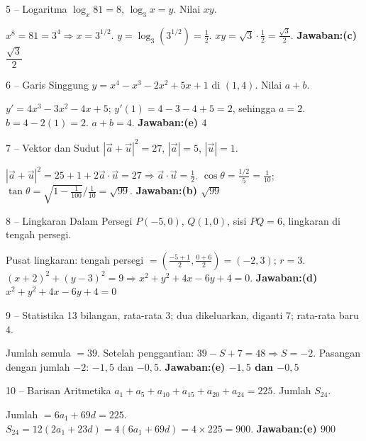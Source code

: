 \documentclass[11pt]{article}
\newcommand{\jawaban}[1]{\textbf{Jawaban:}\enspace\colorbox{gold!30}{\textbf{#1}}}
\begin{document}
\begin{soal}{5 -- Logaritma}
$\log_x81=8$, $\log_3x=y$. Nilai $xy$.
\end{soal}
\begin{pembox}
$x^8=81=3^4\Rightarrow x=3^{1/2}$. $y=\log_3(3^{1/2})=\frac12$. $xy=\sqrt3\cdot\frac12=\frac{\sqrt3}{2}$.
\jawaban{(c) $\dfrac{\sqrt3}{2}$}
\end{pembox}

\begin{soal}{6 -- Garis Singgung}
$y=x^4-x^3-2x^2+5x+1$ di $(1,4)$. Nilai $a+b$.
\end{soal}
\begin{pembox}
$y'=4x^3-3x^2-4x+5$; $y'(1)=4-3-4+5=2$, sehingga $a=2$.
$b=4-2(1)=2$. $a+b=4$.
\jawaban{(e) $4$}
\end{pembox}

\begin{soal}{7 -- Vektor dan Sudut}
$|\vec a+\vec u|^2=27$, $|\vec a|=5$, $|\vec u|=1$.
\end{soal}
\begin{pembox}
$|\vec a+\vec u|^2=25+1+2\vec a\cdot\vec u=27\Rightarrow\vec a\cdot\vec u=\frac12$.
$\cos\theta=\frac{1/2}{5}=\frac{1}{10}$; $\tan\theta=\sqrt{1-\frac{1}{100}}\big/\frac{1}{10}=\sqrt{99}$.
\jawaban{(b) $\sqrt{99}$}
\end{pembox}

\begin{soal}{8 -- Lingkaran Dalam Persegi}
$P(-5,0)$, $Q(1,0)$, sisi $PQ=6$, lingkaran di tengah persegi.
\end{soal}
\begin{pembox}
Pusat lingkaran: tengah persegi $=\left(\frac{-5+1}{2},\frac{0+6}{2}\right)=(-2,3)$; $r=3$.
$(x+2)^2+(y-3)^2=9\Rightarrow x^2+y^2+4x-6y+4=0$.
\jawaban{(d) $x^2+y^2+4x-6y+4=0$}
\end{pembox}

\begin{soal}{9 -- Statistika}
13 bilangan, rata-rata 3; dua dikeluarkan, diganti 7; rata-rata baru 4.
\end{soal}
\begin{pembox}
Jumlah semula $=39$. Setelah penggantian: $39-S+7=48\Rightarrow S=-2$.
Pasangan dengan jumlah $-2$: $-1{,}5$ dan $-0{,}5$.
\jawaban{(e) $-1{,}5$ dan $-0{,}5$}
\end{pembox}

\begin{soal}{10 -- Barisan Aritmetika}
$a_1+a_5+a_{10}+a_{15}+a_{20}+a_{24}=225$. Jumlah $S_{24}$.
\end{soal}
\begin{pembox}
Jumlah $=6a_1+69d=225$. $S_{24}=12(2a_1+23d)=4(6a_1+69d)=4\times225=900$.
\jawaban{(e) $900$}
\end{pembox}
\end{document}
